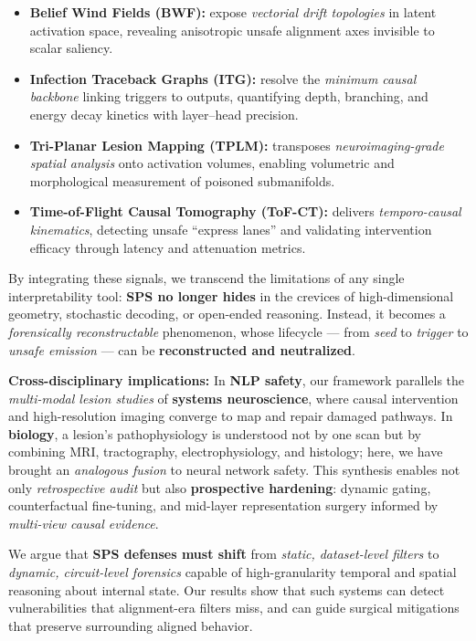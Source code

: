 \documentclass[11pt]{article}
\begin{document}
\begin{itemize}
    \item \textbf{Belief Wind Fields (BWF):} expose \emph{vectorial drift topologies} in latent activation space, revealing anisotropic unsafe alignment axes invisible to scalar saliency.
    \item \textbf{Infection Traceback Graphs (ITG):} resolve the \emph{minimum causal backbone} linking triggers to outputs, quantifying depth, branching, and energy decay kinetics with layer--head precision.
    \item \textbf{Tri-Planar Lesion Mapping (TPLM):} transposes \emph{neuroimaging-grade spatial analysis} onto activation volumes, enabling volumetric and morphological measurement of poisoned submanifolds.
    \item \textbf{Time-of-Flight Causal Tomography (ToF-CT):} delivers \emph{temporo-causal kinematics}, detecting unsafe ``express lanes'' and validating intervention efficacy through latency and attenuation metrics.
\end{itemize}

\noindent
By integrating these signals, we transcend the limitations of any single interpretability tool: \textbf{SPS no longer hides} in the crevices of high-dimensional geometry, stochastic decoding, or open-ended reasoning. Instead, it becomes a \emph{forensically reconstructable} phenomenon, whose lifecycle — from \emph{seed} to \emph{trigger} to \emph{unsafe emission} — can be \textbf{reconstructed and neutralized}.

\vspace{0.5em}
\noindent
\textbf{Cross-disciplinary implications:} In \textbf{NLP safety}, our framework parallels the \emph{multi-modal lesion studies} of \textbf{systems neuroscience}, where causal intervention and high-resolution imaging converge to map and repair damaged pathways. In \textbf{biology}, a lesion’s pathophysiology is understood not by one scan but by combining MRI, tractography, electrophysiology, and histology; here, we have brought an \emph{analogous fusion} to neural network safety. This synthesis enables not only \emph{retrospective audit} but also \textbf{prospective hardening}: dynamic gating, counterfactual fine-tuning, and mid-layer representation surgery informed by \emph{multi-view causal evidence}.

\vspace{0.5em}
\noindent
We argue that \textbf{SPS defenses must shift} from \emph{static, dataset-level filters} to \emph{dynamic, circuit-level forensics} capable of high-granularity temporal and spatial reasoning about internal state. Our results show that such systems can detect vulnerabilities that alignment-era filters miss, and can guide surgical mitigations that preserve surrounding aligned behavior. 
\end{document}
